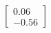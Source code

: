 \documentclass[preview]{standalone}
\begin{document}
\begin{align*}
\begin{bmatrix} 0.06 \\ -0.56 \end{bmatrix}
\end{align*}
\end{document}
